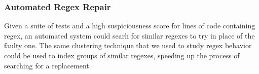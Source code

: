 \subsubsection{Automated Regex Repair}
Given a suite of tests and a high suspiciousness score for lines of code containing regex, an automated system could searh for similar regexes to try in place of the faulty one.  The same clustering technique that we used to study regex behavior could be used to index groups of similar regexes, speeding up the process of searching for a replacement.



